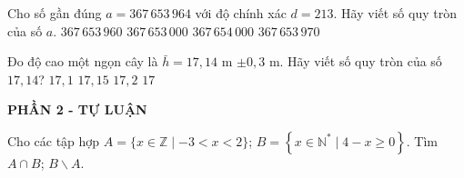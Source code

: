 \begin{ex}%
Cho số gần đúng $a=367\,653\,964$ với độ chính xác $d=213$. Hãy viết số quy tròn của số $a$.
	\choice
	{$367\,653\,960$}
	{$367\,653\,000$}
	{\True $367\,654\,000$}
	{$367\,653\,970$}	
\end{ex}

\begin{ex}%
 Đo độ cao một ngọn cây là $\bar{h}=17{,}14$ m $\pm 0{,}3 $ m. Hãy viết số quy tròn của số $17{,}14$? 
	\choice
	{$17{,}1$}
	{$17{,}15$}
	{$17{,}2$}
	{\True $17$}	
\end{ex}



\begin{center}
	\textbf{PHẦN 2 - TỰ LUẬN}
\end{center}

\begin{bt}%
	Cho các tập hợp $A=\{x \in \mathbb{Z} \mid-3<x<2\}$; $B=\left\{x \in \mathbb{N}^* \mid 4-x \geq 0\right\}$. Tìm $A \cap B$; $B\backslash A$.
\end{bt}

